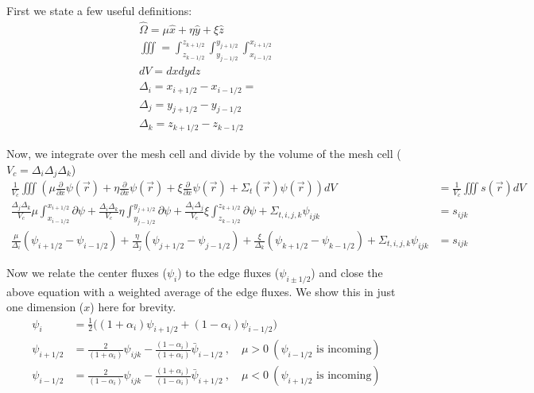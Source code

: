 \documentclass[10pt]{article}
\begin{document}
First we state a few useful definitions:
%
\begin{gather*}
     \hat{\Omega} = \mu\hat{x} + \eta\hat{y} + \xi\hat{z} \\
     \iiint = \int_{z_{k - 1/2}}^{z_{k + 1/2}} \int_{y_{j - 1/2}}^{y_{j + 1/2}} \int_{x_{i - 1/2}}^{x_{i + 1/2}} \\
     dV = dxdydz \\
     \Delta_i = x_{i + 1/2 } - x_{i - 1/2} = \\
     \Delta_j = y_{j + 1/2 } - y_{j - 1/2} \\
     \Delta_k = z_{k + 1/2 } - z_{k - 1/2}
\end{gather*}

Now, we integrate over the mesh cell and divide by the volume of the mesh cell ($V_c = \Delta_i\Delta_j\Delta_k$)
%
\begin{align*}
    \frac{1}{V_c}\iiint \left( \mu \frac{\partial}{\partial x} \psi(\vec{r}) + \eta \frac{\partial}{\partial x} \psi(\vec{r})  +\xi \frac{\partial}{\partial x} \psi(\vec{r})  + \Sigma_t(\vec{r}) \psi(\vec{r}) \right) dV &= \frac{1}{V_c}\iiint s(\vec{r}) dV \\
    \frac{\Delta_j\Delta_k}{V_c} \mu \int_{x_{i - 1/2}}^{x_{i + 1/2}} \partial \psi  + \frac{\Delta_i\Delta_k}{V_c} \eta \int_{y_{j - 1/2}}^{y_{j + 1/2}} \partial \psi + \frac{\Delta_i\Delta_j}{V_c} \xi \int_{z_{k - 1/2}}^{z_{k + 1/2}} \partial \psi + \Sigma_{t,i,j,k}\psi_{ijk} &= s_{ijk}  \\
    \frac{\mu}{\Delta_i} (\psi_{i+1/2} - \psi_{i-1/2} ) + \frac{\eta}{\Delta_j} (\psi_{j+1/2} - \psi_{j-1/2} ) + \frac{\xi}{\Delta_k} (\psi_{k+1/2} - \psi_{k-1/2} ) + \Sigma_{t,i,j,k}\psi_{ijk} &= s_{ijk}
\end{align*}

Now we relate the center fluxes ($\psi_{i}$) to the edge fluxes ($\psi_{i\pm 1/2}$) and close the above equation with a weighted average of the edge fluxes. We show this in just one dimension ($x$) here for brevity. 
%
\begin{align*}
\psi_{i} &= \frac{1}{2}\bigl((1+\alpha_i)\psi_{i+1/2}+(1-\alpha_i)\psi_{i-1/2}\bigr)\\
\psi_{i+1/2} &= \frac{2}{(1+\alpha_i)}\psi_{ijk}-
    \frac{(1-\alpha_i)}{(1+\alpha_i)}\bar{\psi}_{i-1/2}\:,\quad \mu>0\:(\psi_{i-1/2}\text{ is incoming})\\
\psi_{i-1/2} &= \frac{2}{(1-\alpha_i)}\psi_{ijk}-
    \frac{(1+\alpha_i)}{(1-\alpha_i)}\bar{\psi}_{i+1/2}\:,\quad \mu<0 \:(\psi_{i+1/2}\text{ is incoming})
\end{align*}
\end{document}
